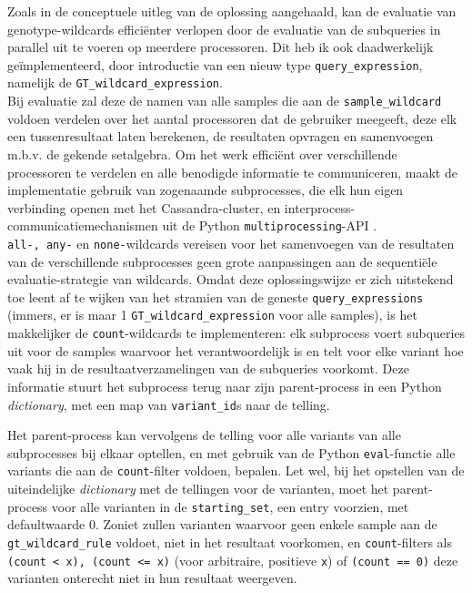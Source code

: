 Zoals in de conceptuele uitleg van de oplossing aangehaald, kan de evaluatie van genotype-wildcards effici\"enter verlopen door de evaluatie van de subqueries in parallel uit te voeren op meerdere processoren. Dit heb ik ook daadwerkelijk ge\"implementeerd, door introductie van een nieuw type \texttt{query\_expression}, namelijk de \texttt{GT\_wildcard\_expression}.\\
Bij evaluatie zal deze de namen van alle samples die aan de \texttt{sample\_wildcard} voldoen verdelen over het aantal processoren dat de gebruiker meegeeft, deze elk een tussenresultaat laten berekenen, de resultaten opvragen en samenvoegen m.b.v. de gekende setalgebra. Om het werk effici\"ent over verschillende processoren te verdelen en alle benodigde informatie te communiceren, maakt de implementatie gebruik van zogenaamde subprocesses, die elk hun eigen verbinding openen met het Cassandra-cluster, en interprocess-communicatiemechanismen uit de Python \texttt{multiprocessing}-API \cite{multiprocessing}.\\



\texttt{all-, any-} en \texttt{none-}wildcards vereisen voor het samenvoegen van de resultaten van de verschillende subprocesses geen grote aanpassingen aan de sequenti\"ele evaluatie-strategie van wildcards. Omdat deze oplossingswijze er zich uitstekend toe leent af te wijken van het stramien van de geneste \texttt{query\_expressions} (immers, er is maar 1 \texttt{GT\_wildcard\_expression} voor alle samples), is het makkelijker de \texttt{count}-wildcards te implementeren: elk subprocess voert subqueries uit voor de samples waarvoor het verantwoordelijk is en telt voor elke variant hoe vaak hij in de resultaatverzamelingen van de subqueries voorkomt. Deze informatie stuurt het subprocess terug naar zijn parent-process in een Python \textit{dictionary}, met een map van \texttt{variant\_id}s naar de telling.



Het parent-process kan vervolgens de telling voor alle variants van alle subprocesses bij elkaar optellen, en met gebruik van de Python \texttt{eval}-functie alle variants die aan de \texttt{count}-filter voldoen, bepalen. Let wel, bij het opstellen van de uiteindelijke \textit{dictionary} met de tellingen voor de varianten, moet het parent-process voor alle varianten in de \texttt{starting\_set}, een entry voorzien, met defaultwaarde 0. Zoniet zullen varianten waarvoor geen enkele sample aan de \texttt{gt\_wildcard\_rule} voldoet, niet in het resultaat voorkomen, en \texttt{count}-filters als \texttt{(count < x), (count <= x)} (voor arbitraire, positieve \texttt{x}) of \texttt{(count == 0)}  deze varianten onterecht niet in hun resultaat weergeven.

